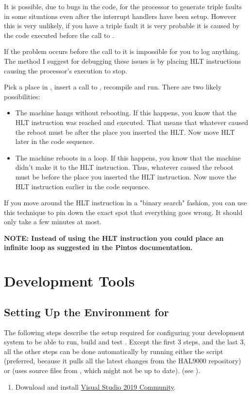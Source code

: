 \begin{appendices}
It is possible, due to bugs in the code, for the processor to generate triple faults in some
situations even after the interrupt handlers have been setup. However this is very unlikely, if you
have a triple fault it is very probable it is caused by the code executed before the call to
.

If the problem occurs before the call to  it is impossible for
you to log anything. The method I suggest for debugging these issues is by placing HLT instructions
causing the processor's execution to stop.

Pick a place in \projectname, insert a call to , recompile and run. There are two
likely possibilities:
\begin{itemize}
	\item The machine hangs without rebooting. If this happens, you know that the HLT instruction
was reached and executed. That means that whatever caused the reboot must be after the place you
inserted the HLT. Now move HLT later in the code sequence.

	\item The machine reboots in a loop. If this happens, you know that the machine didn't make it
to the HLT instruction. Thus, whatever caused the reboot must be before the place you inserted the
HLT instruction. Now move the HLT instruction earlier in the code sequence.
\end{itemize}

If you move around the HLT instruction in a "binary search" fashion, you can use this technique to
pin down the exact spot that everything goes wrong. It should only take a few minutes at most.

\textbf{NOTE: Instead of using the HLT instruction you could place an infinite loop as suggested in
the Pintos documentation.}

\chapter{Development Tools}

\section{Setting Up the Environment for \projectname}
\label{sect:SetupBuild}

The following steps describe the setup required for configuring your development system to be
able to run, build and test \projectname. Except the first 3 steps, and the last 3, all the other
steps can be done automatically by running either the script  (preferred, 
because it pulls all the latest changes from the HAL9000 repository) or 
(uses source files from , which might not be up to date).
(see ).
\begin{enumerate}
	\item Download and install 
\href{https://visualstudio.microsoft.com/downloads/}{Visual Studio 2019 Community}.


\end{enumerate}
\end{appendices}
